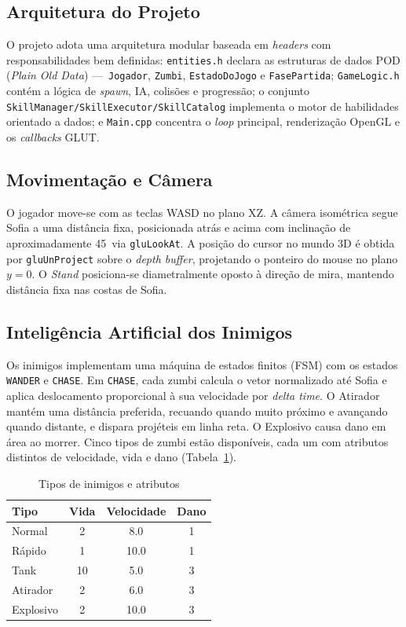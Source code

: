 \documentclass[12pt,a4paper]{article}
\begin{document}
\subsection{Arquitetura do Projeto}

O projeto adota uma arquitetura modular baseada em \textit{headers} com
responsabilidades bem definidas:
\texttt{entities.h} declara as estruturas de dados POD (\textit{Plain Old
Data}) —\ \texttt{Jogador}, \texttt{Zumbi}, \texttt{EstadoDoJogo} e
\texttt{FasePartida};
\texttt{GameLogic.h} contém a lógica de \textit{spawn}, IA, colisões e
progressão;
o conjunto \texttt{SkillManager/SkillExecutor/SkillCatalog} implementa o
motor de habilidades orientado a dados;
e \texttt{Main.cpp} concentra o \textit{loop} principal, renderização
OpenGL e os \textit{callbacks} GLUT.

\subsection{Movimentação e Câmera}

O jogador move-se com as teclas WASD no plano XZ.
A câmera isométrica segue Sofia a uma distância fixa, posicionada atrás e
acima com inclinação de aproximadamente 45\textdegree\ via
\texttt{gluLookAt}.
A posição do cursor no mundo 3D é obtida por
\texttt{gluUnProject} sobre o \textit{depth buffer}, projetando o
ponteiro do mouse no plano $y = 0$.
O \textit{Stand} posiciona-se diametralmente oposto à direção de mira,
mantendo distância fixa nas costas de Sofia.

\subsection{Inteligência Artificial dos Inimigos}

Os inimigos implementam uma máquina de estados finitos (FSM) com os estados
\texttt{WANDER} e \texttt{CHASE}.
Em \texttt{CHASE}, cada zumbi calcula o vetor normalizado até Sofia e aplica
deslocamento proporcional à sua velocidade por \textit{delta time}.
O Atirador mantém uma distância preferida, recuando quando muito próximo e
avançando quando distante, e dispara projéteis em linha reta.
O Explosivo causa dano em área ao morrer.
Cinco tipos de zumbi estão disponíveis, cada um com atributos distintos de
velocidade, vida e dano (Tabela~\ref{tab:zumbis}).

\begin{table}[H]
\caption{Tipos de inimigos e atributos}
\label{tab:zumbis}
\centering
\begin{tabular}{|l|c|c|c|}
\hline
\textbf{Tipo}    & \textbf{Vida} & \textbf{Velocidade} & \textbf{Dano} \\
\hline
Normal    &  2 & 8.0  & 1 \\
Rápido    &  1 & 10.0 & 1 \\
Tank      & 10 & 5.0  & 3 \\
Atirador  &  2 & 6.0  & 3 \\
Explosivo &  2 & 10.0 & 3 \\
\hline
\end{tabular}
\end{table}
\end{document}
